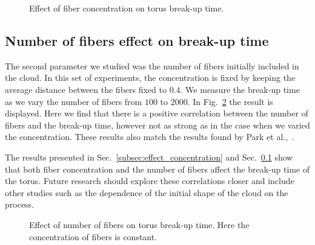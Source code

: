 \begin{figure}[htbp]
  \centering
  \caption[Effect of fiber concentration on torus break-up time.]{Effect of fiber concentration on torus break-up time.}
  \label{fig:concentration_breakup}
\end{figure}

\subsection{Number of fibers effect on break-up time}
\label{subsec:effect_number}

The second parameter we studied was the number of fibers initially included in the cloud. In this set of experiments, the concentration is fixed by keeping the average distance between the fibers fixed to $0.4$. We measure the break-up time as we vary the number of fibers from $100$ to $2000$. In Fig.~\ref{fig:number_breakup} the result is displayed. Here we find that there is a positive correlation between the number of fibers and the break-up time, however not as strong as in the case when we varied the concentration. These results also match the results found by Park et al.,~\cite{Park2010}.

The results presented in Sec.~\ref{subsec:effect_concentration} and Sec.~\ref{subsec:effect_number} show that both fiber concentration and the number of fibers affect the break-up time of the torus. Future research should explore these correlations closer and include other studies such as the dependence of the initial shape of the cloud on the process.

\begin{figure}[htbp]
  \centering
  \caption[Effect of number of fibers on torus break-up time.]{Effect of number of fibers on torus break-up time. Here the concentration of fibers is constant.}
  \label{fig:number_breakup}
\end{figure}

